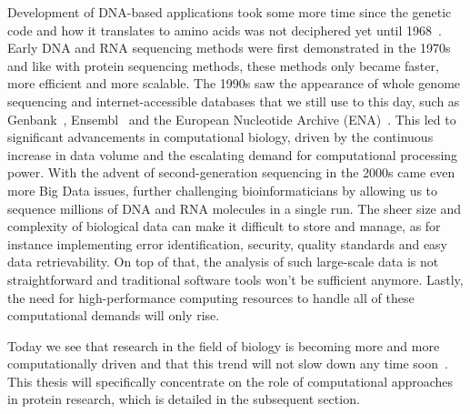 Development of DNA-based applications took some more time since the genetic code and how it translates to amino acids was not deciphered yet until 1968~\cite{codon}. Early DNA and RNA sequencing methods were first demonstrated in the 1970s~\cite{dnaseq, rna} and like with protein sequencing methods, these methods only became faster, more efficient and more scalable. The 1990s saw the appearance of whole genome sequencing and internet-accessible databases that we still use to this day, such as Genbank~\cite{genbank}, Ensembl~\cite{ensembl} and the European Nucleotide Archive (ENA)~\cite{ena}. This led to significant advancements in computational biology, driven by the continuous increase in data volume and the escalating demand for computational processing power. With the advent of second-generation sequencing in the 2000s came even more Big Data issues, further challenging bioinformaticians by allowing us to sequence millions of DNA and RNA molecules in a single run. The sheer size and complexity of biological data can make it difficult to store and manage, as for instance implementing error identification, security, quality standards and easy data retrievability. On top of that, the analysis of such large-scale data is not straightforward and traditional software tools won't be sufficient anymore. Lastly, the need for high-performance computing resources to handle all of these computational demands will only rise.

Today we see that research in the field of biology is becoming more and more computationally driven and that this trend will not slow down any time soon~\cite{compbio}. This thesis will specifically concentrate on the role of computational approaches in protein research, which is detailed in the subsequent section.